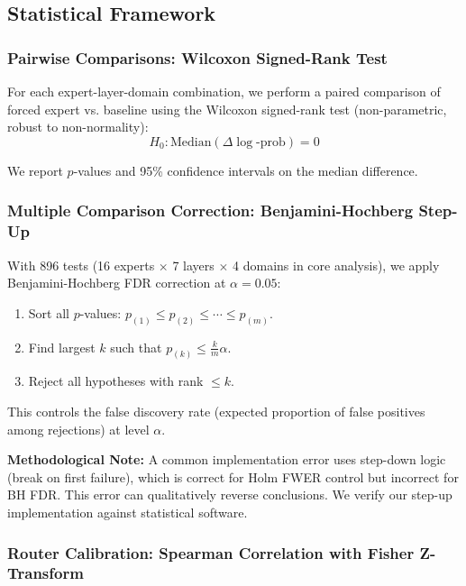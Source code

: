 \documentclass[11pt,a4paper]{article}
\begin{document}
\subsection{Statistical Framework}

\subsubsection{Pairwise Comparisons: Wilcoxon Signed-Rank Test}

For each expert-layer-domain combination, we perform a paired comparison of forced expert vs. baseline using the Wilcoxon signed-rank test (non-parametric, robust to non-normality):
\begin{equation}
H_0: \text{Median}(\Delta \log\text{-prob}) = 0
\end{equation}

We report $p$-values and 95\% confidence intervals on the median difference.

\subsubsection{Multiple Comparison Correction: Benjamini-Hochberg Step-Up}

With 896 tests (16 experts $\times$ 7 layers $\times$ 4 domains in core analysis), we apply Benjamini-Hochberg FDR correction at $\alpha = 0.05$:

\begin{enumerate}
\item Sort all $p$-values: $p_{(1)} \leq p_{(2)} \leq \cdots \leq p_{(m)}$.
\item Find largest $k$ such that $p_{(k)} \leq \frac{k}{m} \alpha$.
\item Reject all hypotheses with rank $\leq k$.
\end{enumerate}

This controls the false discovery rate (expected proportion of false positives among rejections) at level $\alpha$.

\textbf{Methodological Note:} A common implementation error uses step-down logic (break on first failure), which is correct for Holm FWER control but incorrect for BH FDR. This error can qualitatively reverse conclusions. We verify our step-up implementation against statistical software.

\subsubsection{Router Calibration: Spearman Correlation with Fisher Z-Transform}
\end{document}
